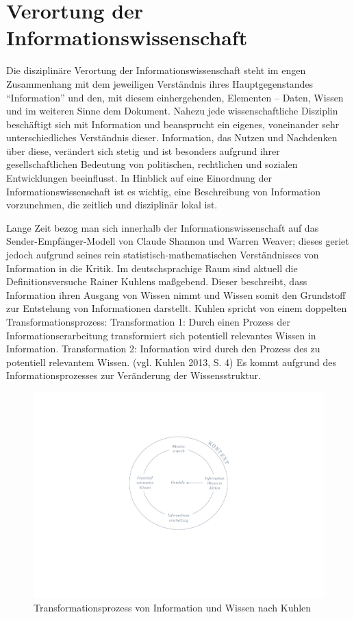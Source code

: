 \documentclass[a4paper,
fontsize=11pt,
oneside,
numbers=noperiodatend,
parskip=half-,
bibliography=totoc,
final
]{scrartcl}
\begin{document}
\section*{Verortung der
Informationswissenschaft}\label{verortung-der-informationswissenschaft}

Die disziplinäre Verortung der Informationswissenschaft steht im engen
Zusammenhang mit dem jeweiligen Verständnis ihres Hauptgegenstandes
\enquote{Information} und den, mit diesem einhergehenden, Elementen --
Daten, Wissen und im weiteren Sinne dem Dokument. Nahezu jede
wissenschaftliche Disziplin beschäftigt sich mit Information und
beansprucht ein eigenes, voneinander sehr unterschiedliches Verständnis
dieser. Information, das Nutzen und Nachdenken über diese, verändert
sich stetig und ist besonders aufgrund ihrer gesellschaftlichen
Bedeutung von politischen, rechtlichen und sozialen Entwicklungen
beeinflusst. In Hinblick auf eine Einordnung der
Informationswissenschaft ist es wichtig, eine Beschreibung von
Information vorzunehmen, die zeitlich und disziplinär lokal ist.

Lange Zeit bezog man sich innerhalb der Informationswissenschaft auf das
Sender-Empfänger-Modell von Claude Shannon und Warren Weaver; dieses
geriet jedoch aufgrund seines rein statistisch-mathematischen
Verständnisses von Information in die Kritik. Im deutschsprachige Raum
sind aktuell die Definitionsversuche Rainer Kuhlens maßgebend. Dieser
beschreibt, dass Information ihren Ausgang von Wissen nimmt und Wissen
somit den Grundstoff zur Entstehung von Informationen darstellt. Kuhlen
spricht von einem doppelten Transformationsprozess: Transformation 1:
Durch einen Prozess der Informationserarbeitung transformiert sich
potentiell relevantes Wissen in Information. Transformation 2:
Information wird durch den Prozess des zu potentiell relevantem Wissen.
(vgl. Kuhlen 2013, S. 4) Es kommt aufgrund des Informationsprozesses zur
Veränderung der Wissensstruktur.

\begin{figure}
\centering
\includegraphics{img/Transformation_Information.jpg}
\caption{Transformationsprozess von Information und Wissen nach Kuhlen}
\end{figure}
\end{document}
